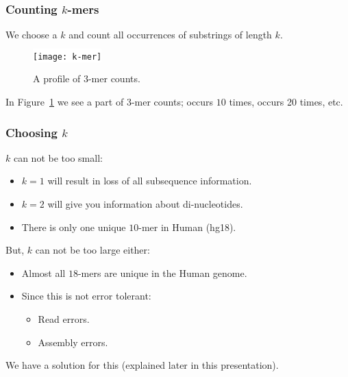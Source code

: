 \documentclass[slidestop]{beamer}
\begin{document}
\begin{frame}
  \frametitle{Counting $k$-mers}

  We choose a $k$ and count all occurrences of substrings of length $k$.
  \pause

  \begin{figure}
    \colorbox{white}{
      \texttt{[image: k-mer]}
    }
    \vspace{-0.5cm}
    \caption{A profile of $3$-mer counts.} \label{fig:kmerprofile}
  \end{figure}

  In Figure~\ref{fig:kmerprofile} we see a part of $3$-mer counts; 
  occurs $10$ times,  occurs 20 times, etc.
\end{frame}

%

\begin{frame}
  \frametitle{Choosing $k$}

  $k$ can not be too small:
  \begin{itemize}
    \item $k = 1$ will result in loss of all subsequence information.
    \item $k = 2$ will give you information about di-nucleotides.
    \item There is only one unique $10$-mer in Human (hg18).
  \end{itemize}
  \bigskip
  \pause

  But, $k$ can not be too large either:
  \begin{itemize}
    \item Almost all $18$-mers are unique in the Human genome.
    \item Since this is not error tolerant:
    \begin{itemize}
      \item Read errors.
      \item Assembly errors.
    \end{itemize}
  \end{itemize}
  \bigskip
  \pause

  We have a solution for this (explained later in this presentation).
\end{frame}
\end{document}
